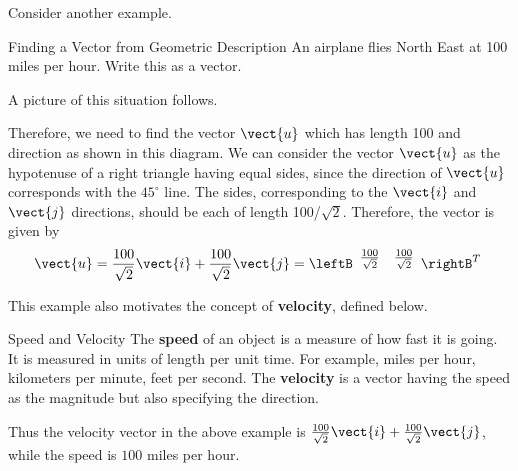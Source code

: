 Consider another example.

\begin{example}{Finding a Vector from Geometric Description}\label{exa:vectorfromgeometricdescription}
An airplane flies North East at 100 miles per hour. Write this as a vector.
\end{example}

\begin{solution}
A picture of this situation follows.

\begin{center}
\end{center}

Therefore, we need to find the vector $\vect{u}$ which has length 100 and direction as shown in this diagram. 
We can consider the vector $\vect{u}$ as the hypotenuse of a
right triangle having equal sides, since the direction of $\vect{u}$ corresponds with the $45 ^{\circ}$ line. 
The sides, corresponding to the $\vect{i}$ and $\vect{j}$ directions,  should be each of length 100/$
\sqrt{2}.$ Therefore, the vector is given by 
\[
 \vect{u} = \frac{100}{\sqrt{2}} \vect{i}+ \frac{100}{\sqrt{2
}}\vect{j}
=
\leftB
\begin{array}{rr}
\vspace{0.05in} \frac{100}{\sqrt{2}} & \vspace{0.05in}\frac{100}{\sqrt{2}}
\end{array}
\rightB^T\
\]
\end{solution}

This example also motivates the concept of \textbf{velocity}, defined below.

\begin{definition}{Speed and Velocity}\label{def:speedvelocity}
The \textbf{speed}
 of an object is a measure of how fast it is going. It is
measured in units of length per unit time. For example, miles per hour,
kilometers per minute, feet per second. The
\textbf{velocity} is a vector having the speed as the
magnitude but also specifying the direction.
\end{definition}

Thus the velocity vector in the above example is $\vspace{0.05in}\frac{100}{\sqrt{2}}\vect{i}+
\vspace{0.05in}\frac{100}{\sqrt{2}}\vect{j}$, while the speed is $100$ miles per hour.

